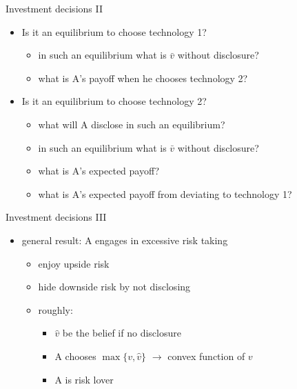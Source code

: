 \documentclass[bigger]{beamer}
\begin{document}
\begin{frame}[label={sec:orgheadline18}]{Investment decisions II}
\begin{itemize}
\item Is it an equilibrium to choose technology 1?
\begin{itemize}
\item in such an equilibrium what is \(\bar{v}\) without disclosure?

\item what is A's payoff when he chooses technology 2?
\end{itemize}

\item Is it an equilibrium to choose technology 2?
\begin{itemize}
\item what will A disclose in such an equilibrium?

\item in such an equilibrium what is \(\bar{v}\) without disclosure?

\item what is A's expected payoff?

\item what is A's expected payoff from deviating to technology 1?
\end{itemize}
\end{itemize}
\end{frame}

\begin{frame}[label={sec:orgheadline19}]{Investment decisions III}
\begin{itemize}
\item general result: A engages in excessive risk taking
\begin{itemize}
\item enjoy upside risk
\item hide downside risk by not disclosing

\item roughly: 
\begin{itemize}
\item \(\hat v\) be the belief if no disclosure
\item A chooses \(\max\{v,\hat v\}\) \(\rightarrow\) convex function of \(v\)
\item A is risk lover
\end{itemize}
\end{itemize}
\end{itemize}
\end{frame}
\end{document}
